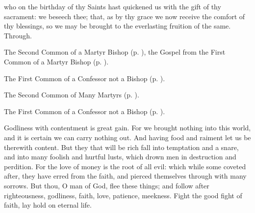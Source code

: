 \postcommunion
{} who on the birthday of thy Saints hast quickened us with the gift of thy sacrament: we beseech thee; that, as by thy grace we now receive the comfort of thy blessings, so we may be brought to the everlasting fruition of the same. Through.



\begin{rubric}
	The Second Common of a Martyr Bishop (p. \pageref{CommonMartyrBishopII}), the Gospel from the First Common of a Martyr Bishop (p. \pageref{CommonMartyrBishopI}).
\end{rubric}



\begin{rubric}
	The First Common of a Confessor not a Bishop (p. \pageref{CommonConfessorNotBishopI}).
\end{rubric}



\begin{rubric}
	The Second Common of Many Martyrs (p. \pageref{CommonMartyrsII}).
\end{rubric}



\begin{rubric}
	The First Common of a Confessor not a Bishop (p. \pageref{CommonConfessorNotBishopI}).
\end{rubric}

 Godliness with contentment is great gain. For we brought nothing into this world, and it is certain we can carry nothing out. And having food and raiment let us be therewith content. But they that will be rich fall into temptation and a snare, and into many foolish and hurtful lusts, which drown men in destruction and perdition. For the love of money is the root of all evil: which while some coveted after, they have erred from the faith, and pierced themselves through with many sorrows. But thou, O man of God, flee these things; and follow after righteousness, godliness, faith, love, patience, meekness. Fight the good fight of faith, lay hold on eternal life.

